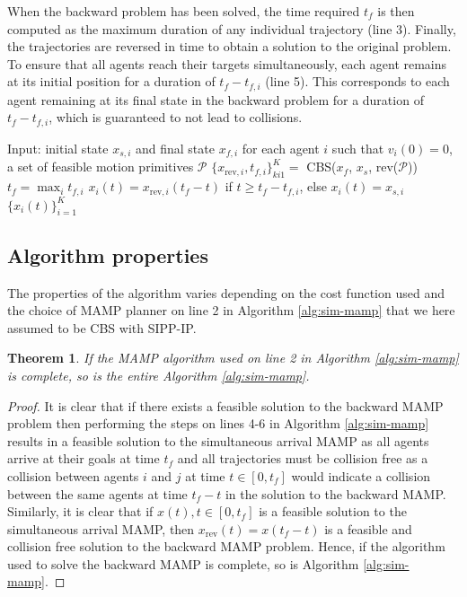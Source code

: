 \documentclass[letterpaper, 10 pt, conference]{ieeeconf}  %
\newtheorem{theorem}{Theorem}
\begin{document}
When the backward problem has been solved, the time required $t_f$ is then computed as the maximum duration of any individual trajectory (line 3). Finally, the trajectories are reversed in time to obtain a solution to the original problem. To ensure that all agents reach their targets simultaneously, each agent remains at its initial position for a duration of $t_f - t_{f, i}$ (line 5). This corresponds to each agent remaining at its final state in the backward problem for a duration of $t_f - t_{f, i}$, which is guaranteed to not lead to collisions.

\begin{algorithm}[tb]
\caption{MAMP with simultaneous arrival}
\label{alg:sim-mamp}
\begin{algorithmic}[1]
\State Input: initial state $x_{s, i}$ and final state $x_{f, i}$ for each agent $i$ such that $v_{i}(0) = 0$, a set of feasible motion primitives $\mathcal{P}$
\State $\{x_{\text{rev}, i}, t_{f, i}\}_{ki1}^K = $ CBS($x_f$, $x_s$, rev($\mathcal{P}$))
\State $t_{f} = \max_i t_{f, i}$
	\State $x_i(t) = x_{\text{rev}, i}(t_{f}-t)$ if $t \geq t_f - t_{f, i}$, else $x_i(t) = x_{s, i}$
\EndFor
\State \Return $\{x_i(t)\}_{i=1}^K$
\end{algorithmic}
\end{algorithm}

\subsection{Algorithm properties}

The properties of the algorithm varies depending on the cost function used and the choice of MAMP planner on line 2 in Algorithm \ref{alg:sim-mamp} that we here assumed to be CBS with SIPP-IP.

\begin{theorem}
If the MAMP algorithm used on line 2 in Algorithm \ref{alg:sim-mamp} is complete, so is the entire Algorithm \ref{alg:sim-mamp}.
\end{theorem}

\begin{proof}
It is clear that if there exists a feasible solution to the backward MAMP problem then performing the steps on lines 4-6 in Algorithm \ref{alg:sim-mamp} results in a feasible solution to the simultaneous arrival MAMP as all agents arrive at their goals at time $t_{f}$ and all trajectories must be collision free as a collision between agents $i$ and $j$ at time $t \in [0, t_{f}]$ would indicate a collision between the same agents at time $t_{f}-t$ in the solution to the backward MAMP. Similarly, it is clear that if $x(t), t \in [0, t_f]$ is a feasible solution to the simultaneous arrival MAMP, then $x_{\text{rev}}(t) = x(t_f-t)$ is a feasible and collision free solution to the backward MAMP problem. Hence, if the algorithm used to solve the backward MAMP is complete, so is Algorithm \ref{alg:sim-mamp}.
\end{proof}
\end{document}
